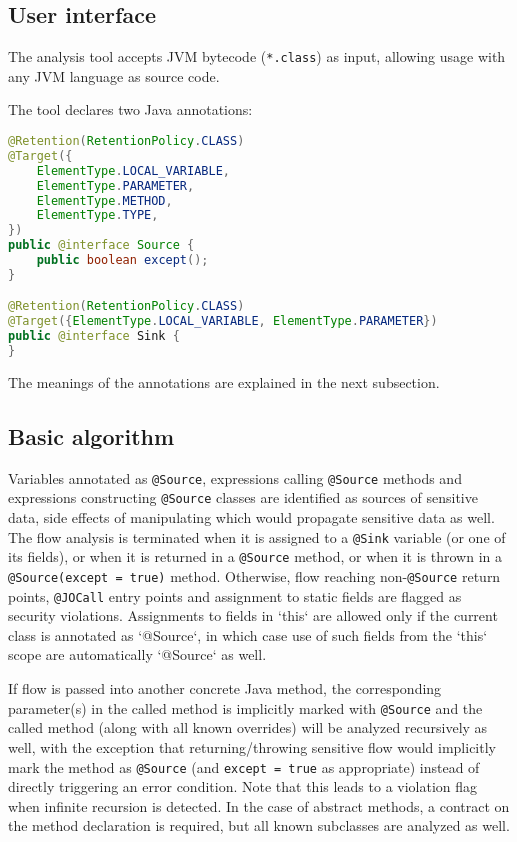 \documentclass[a4paper, 10pt]{article}
\begin{document}
\subsection{User interface}
The analysis tool accepts JVM bytecode (\texttt{*.class}) as input,
allowing usage with any JVM language as source code.

The tool declares two Java annotations:

\begin{lstlisting}[language=Java, caption={@Source and @Sink}, style=j]
@Retention(RetentionPolicy.CLASS)
@Target({
	ElementType.LOCAL_VARIABLE,
	ElementType.PARAMETER,
	ElementType.METHOD,
	ElementType.TYPE,
})
public @interface Source {
	public boolean except();
}

@Retention(RetentionPolicy.CLASS)
@Target({ElementType.LOCAL_VARIABLE, ElementType.PARAMETER})
public @interface Sink {
}
\end{lstlisting}

The meanings of the annotations are explained in the next subsection.

\subsection{Basic algorithm}
Variables annotated as \texttt{@Source},
expressions calling \texttt{@Source} methods
and expressions constructing \texttt{@Source} classes
are identified as sources of sensitive data,
side effects of manipulating which would propagate sensitive data as well.
The flow analysis is terminated
when it is assigned to a \texttt{@Sink} variable (or one of its fields),
or when it is returned in a \texttt{@Source} method,
or when it is thrown in a \texttt{@Source(except = true)} method.
Otherwise, flow reaching non-\texttt{@Source} return points,
\texttt{@JOCall} entry points and assignment to static fields
are flagged as security violations.
Assignments to fields in `this` are allowed
only if the current class is annotated as `@Source`,
in which case use of such fields from the `this` scope are automatically `@Source` as well.

If flow is passed into another concrete Java method,
the corresponding parameter(s) in the called method is implicitly marked with \texttt{@Source}
and the called method (along with all known overrides) will be analyzed recursively as well,
with the exception that returning/throwing sensitive flow
would implicitly mark the method as \texttt{@Source} (and \texttt{except = true} as appropriate)
instead of directly triggering an error condition.
Note that this leads to a violation flag when infinite recursion is detected.
In the case of abstract methods, a contract on the method declaration is required,
but all known subclasses are analyzed as well.
\end{document}
